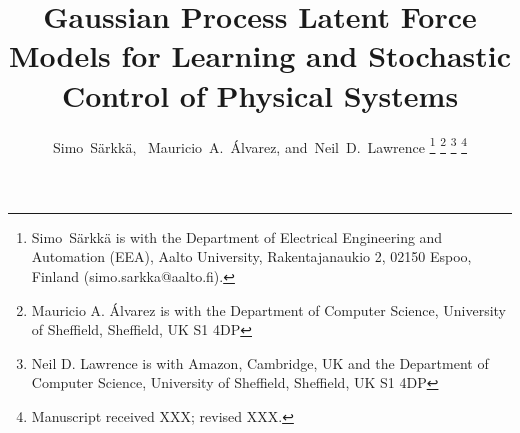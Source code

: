\documentclass[journal]{IEEEtran}
\begin{document}
%
\title{Gaussian Process Latent Force Models for Learning and Stochastic Control of Physical Systems}


%
%
%

\author{Simo~S\"arkk\"a,~
        Mauricio~A.~\'Alvarez, 
        and~Neil~D.~Lawrence%
\thanks{Simo~S\"arkk\"a is with the Department of Electrical Engineering and Automation (EEA), Aalto University, Rakentajanaukio 2, 02150 Espoo, Finland (simo.sarkka@aalto.fi).}%
\thanks{Mauricio A. \'Alvarez is with the Department of Computer Science, University of Sheffield,
Sheffield, UK S1 4DP}%
\thanks{Neil D. Lawrence is with Amazon, Cambridge, UK and the Department of Computer Science, University of Sheffield,
Sheffield, UK S1 4DP}%
\thanks{Manuscript received XXX; revised XXX.}}


%
%
\end{document}
